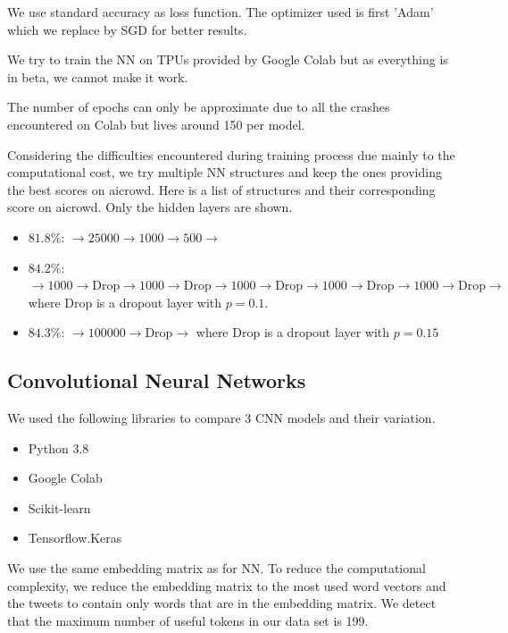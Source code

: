 \documentclass[11pt, a4paper, twocolumn]{article}
\begin{document}
We use standard accuracy as loss function. The optimizer used is first 'Adam' which we replace by SGD for better results.

We try to train the NN on TPUs provided by Google Colab but as everything is in beta, we cannot make it work.

The number of epochs can only be approximate due to all the crashes encountered on Colab but lives around 150 per model.

Considering the difficulties encountered during training process due mainly to the computational cost, we try multiple NN 
structures and keep the ones providing the best scores on aicrowd. 
Here is a list of structures and their corresponding score on aicrowd. Only the hidden layers are shown.
\begin{itemize}
  \item \textbf{$81.8\%$}: $\rightarrow 25000\rightarrow 1000\rightarrow 500\rightarrow $
  \item \textbf{$84.2\%$}: $\rightarrow 1000\rightarrow \text{Drop}\rightarrow 1000
  \rightarrow \text{Drop}\rightarrow 1000\rightarrow \text{Drop}\rightarrow 1000
  \rightarrow \text{Drop}\rightarrow 1000\rightarrow \text{Drop}\rightarrow $ where Drop is a dropout layer with $p=0.1$.
  \item \textbf{$84.3\%$}: $\rightarrow 100000\rightarrow \text{Drop}\rightarrow $ where Drop is a dropout layer with $p=0.15$
\end{itemize}

\subsection{Convolutional Neural Networks}
We used the following libraries to compare 3 CNN models and their variation.
\begin{itemize}
	\setlength\itemsep{1px}
	\item Python 3.8
	\item Google Colab
	\item Scikit-learn
	\item Tensorflow.Keras
\end{itemize}

We use the same embedding matrix as for NN\cite{glovepaper, gloveembedding}. To reduce the computational complexity, we reduce the embedding matrix to the most used word vectors and the tweets to contain only words that are in the embedding matrix. We detect that the maximum number of useful tokens in our data set is 199\label{199}.
\end{document}
